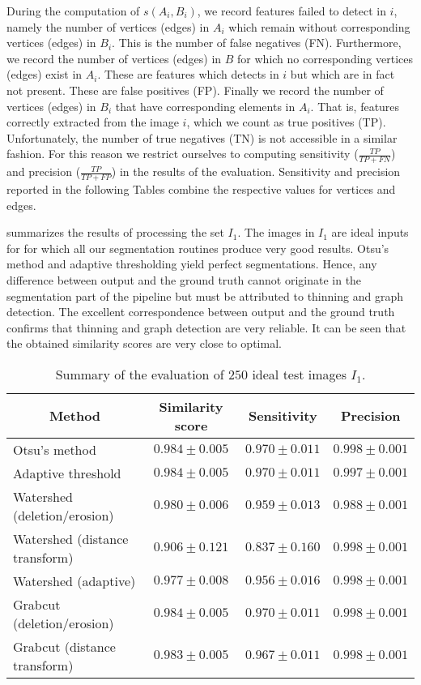 		During the computation of $s(A_i, B_i)$, we record features \NEFI failed to detect in $i$, namely the number of vertices (edges) in $A_i$ which remain without corresponding vertices (edges) in $B_i$. This is the number of false negatives (FN). Furthermore, we record the number of vertices (edges) in $B$ for which no corresponding vertices (edges) exist in $A_i$. These are features which \NEFI detects in $i$ but which are in fact not present. These are false positives (FP). Finally we record the number of vertices (edges) in $B_i$ that have corresponding elements in $A_i$. That is, features correctly extracted from the image $i$, which we count as true positives (TP). Unfortunately, the number of true negatives (TN) is not accessible in a similar fashion. For this reason we restrict ourselves to computing sensitivity ($\tfrac{TP}{TP + FN}$) and precision ($\tfrac{TP}{TP + FP}$) in the results of the evaluation. Sensitivity and precision reported in the following Tables combine the respective values for vertices and edges. 

		 summarizes the results of processing the set $I_1$. The images in $I_1$ are ideal inputs for \NEFI for which all our segmentation routines produce very good results. Otsu's method and adaptive thresholding yield perfect segmentations. Hence, any difference between \NEFIs output and the ground truth cannot originate in the segmentation part of the pipeline but must be attributed to thinning and graph detection. The excellent correspondence between \NEFIs output and the ground truth confirms that thinning and graph detection are very reliable. It can be seen that the obtained similarity scores are very close to optimal.

		\begin{table}
			\centering
			\begin{tabular}{@{} l *3c @{}}
			\toprule
			\multicolumn{1}{c}{Method}    & Similarity score  & Sensitivity  & Precision \\ 
			\midrule
			Otsu's method                   & $0.984 \pm 0.005$ & $0.970 \pm 0.011$ & $0.998 \pm 0.001$ \\
			Adaptive threshold              & $0.984 \pm 0.005$ & $0.970 \pm 0.011$ & $0.997 \pm 0.001$ \\
			Watershed (deletion/erosion)    & $0.980 \pm 0.006$ & $0.959 \pm 0.013$ & $0.988 \pm 0.001$ \\
			Watershed (distance transform)  & $0.906 \pm 0.121$ & $0.837 \pm 0.160$ & $0.998 \pm 0.001$ \\
			Watershed (adaptive)            & $0.977 \pm 0.008$ & $0.956 \pm 0.016$ & $0.998 \pm 0.001$ \\
			Grabcut (deletion/erosion)      & $0.984 \pm 0.005$ & $0.970 \pm 0.011$ & $0.998 \pm 0.001$ \\
			Grabcut (distance transform)    & $0.983 \pm 0.005$ & $0.967 \pm 0.011$ & $0.998 \pm 0.001$ \\
			\bottomrule
			\end{tabular}
			\caption[\NEFIs evaluation: Ideal images]{Summary of the evaluation of $250$ ideal test images $I_1$.}
			\label{tab:optimal}
		\end{table}

